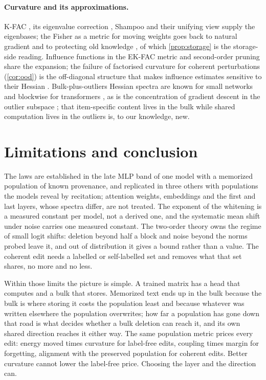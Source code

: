 \documentclass{article}
\theoremstyle{definition}\newtheorem{law}{Empirical law}
\begin{document}
\paragraph{Curvature and its approximations.} K-FAC \citep{martens2015optimizing}, its eigenvalue correction \citep{george2018fast}, Shampoo \citep{gupta2018shampoo} and their unifying view \citep{eschenhagen2023kfac} supply the eigenbases; the Fisher as a metric for moving weights goes back to natural gradient \citep{amari1998natural,martens2020new} and to protecting old knowledge \citep{kirkpatrick2017overcoming}, of which \cref{prop:storage} is the storage-side reading. Influence functions in the EK-FAC metric \citep{koh2017understanding,grosse2023studying,bae2024source} and second-order pruning \citep{lecun1989optimal,hassibi1993optimal} share the expansion; the failure of factorised curvature for coherent perturbations (\cref{cor:ood}) is the off-diagonal structure that makes influence estimates sensitive to their Hessian \citep{hong2025better}. Bulk-plus-outliers Hessian spectra are known for small networks \citep{sagun2017empirical,papyan2019measurements,ghorbani2019investigation} and blockwise for transformers \citep{zhang2024transformers}, as is the concentration of gradient descent in the outlier subspace \citep{gurari2018gradient}; that item-specific content lives in the bulk while shared computation lives in the outliers is, to our knowledge, new.

\section{Limitations and conclusion}

The laws are established in the late MLP band of one model with a memorized population of known provenance, and replicated in three others with populations the models reveal by recitation; attention weights, embeddings and the first and last layers, whose spectra differ, are not treated. The exponent of the whitening is a measured constant per model, not a derived one, and the systematic mean shift under noise carries one measured constant. The two-order theory owns the regime of small logit shifts: deletion beyond half a block and noise beyond the norms probed leave it, and out of distribution it gives a bound rather than a value. The coherent edit needs a labelled or self-labelled set and removes what that set shares, no more and no less.

Within those limits the picture is simple. A trained matrix has a head that computes and a bulk that stores. Memorized text ends up in the bulk because the bulk is where storing it costs the population least and because whatever was written elsewhere the population overwrites; how far a population has gone down that road is what decides whether a bulk deletion can reach it, and its own shared direction reaches it either way. The same population metric prices every edit: energy moved times curvature for label-free edits, coupling times margin for forgetting, alignment with the preserved population for coherent edits. Better curvature cannot lower the label-free price. Choosing the layer and the direction can.
\end{document}
